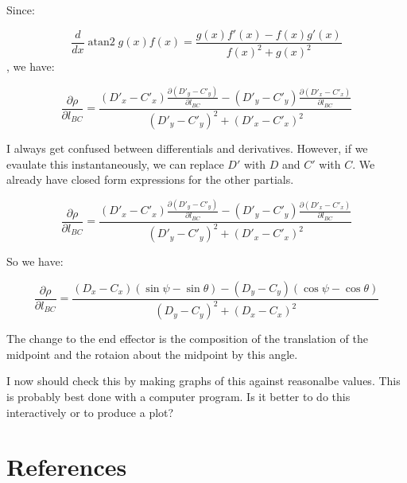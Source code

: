 \documentclass[11pt]{article}
\DeclareMathOperator{\atantwo}{atan2}
\begin{document}
 Since:

 \[
 \frac{d}{dx} \atantwo{g(x)}{f(x)} = \frac{g(x)f'(x) - f(x)g'(x)}{f(x)^2 + g(x)^2}
 \]
 , we have:

 
 
\[
\frac{\partial \rho}{ \partial l_{BC}} = \frac{ (D'_x - C'_x)\frac{\partial (D'_y - C'_y)}{\partial l_{BC}}
  - (D'_y - C'_y)\frac{\partial (D'_x - C'_x)}{\partial l_{BC}}
}
  {(D'_y - C'_y)^2 + (D'_x - C'_x)^2}
  \]

  I always get confused between differentials and derivatives.  However, if we evaulate this instantaneously,
  we can replace $D'$ with $D$ and $C'$ with $C$. We already have closed form expressions for the other partials.

  \[
\frac{\partial \rho}{ \partial l_{BC}} = \frac{ (D'_x - C'_x)\frac{\partial (D'_y - C'_y)}{\partial l_{BC}}
  - (D'_y - C'_y)\frac{\partial (D'_x - C'_x)}{\partial l_{BC}}
}
  {(D'_y - C'_y)^2 + (D'_x - C'_x)^2}
  \]

  So we have:
  
    \[
    \frac{\partial \rho}{ \partial l_{BC}} = \frac{ (D_x - C_x)(\sin{\psi} -\sin{\theta})
      - (D_y - C_y)(\cos{\psi} - \cos{\theta})}
  {(D_y - C_y)^2 + (D_x - C_x)^2}
  \]

  The change to the end effector is the composition of the translation of the midpoint and
  the rotaion about the midpoint by this angle.

  I now should check this by making graphs of this against reasonalbe values. This is
  probably best done with a computer program. Is it better to do this interactively or to produce a plot?


\section{References}
\end{document}
